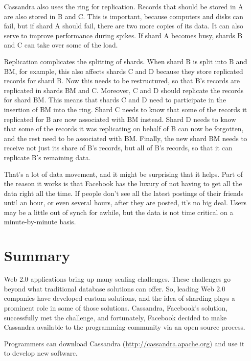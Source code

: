 Cassandra also uses the ring for replication.
Records that should be stored in A
are also stored in B and C.
This is important, because computers and disks can fail,
but if shard A should fail, there are two more copies of its data.
It can also serve to improve performance during spikes.
If shard A becomes busy, shards B and C can take over some of the load.

Replication complicates the splitting of shards.
When shard B is split into B and BM, for example, this also affects shards C and D
because they store replicated records for shard B.
Now this needs to be restructured, so that B's records are replicated in shards BM and C.
Moreover, C and D should replicate the records for shard BM.
This means that shards C and D need
to participate in the insertion of BM into the ring.
Shard C needs to know that some of the records
it replicated for B are now associated with BM instead.
Shard D needs to know that some of the records it was replicating
on behalf of B can now be forgotten, and the rest need to be associated with BM.
Finally, the new shard BM needs to receive not just its share
of B's records, but all of B's records, so that it can replicate B's remaining data.

That's a lot of data movement, and it might be surprising that it helps.
Part of the reason it works is that Facebook has the luxury of not having
to get all the data right all the time.
If people don't see all the latest postings of their friends until
an hour, or even several hours, after they are posted, it's no big deal.
Users may be a little out of synch for awhile, but the data is not time critical
on a minute-by-minute basis.

\section{Summary}

Web 2.0 applications bring up many scaling challenges.
These challenges go beyond what traditional database solutions can offer.
So, leading Web 2.0 companies have developed custom solutions,
and the idea of sharding plays a prominent role in some of those solutions.
Cassandra, Facebook's solution, successfully met the challenge, and
fortunately, Facebook decided to make Cassandra available to the
programming community via an open source process.

Programmers can download Cassandra (\url{http://cassandra.apache.org})
and use it to develop new software.

